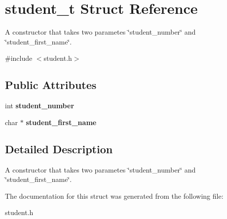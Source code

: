 \hypertarget{structstudent__t}{}\section{student\+\_\+t Struct Reference}
\label{structstudent__t}


A constructor that takes two parametes \char`\"{}student\+\_\+number\char`\"{} and \char`\"{}student\+\_\+first\+\_\+name\char`\"{}.  




{\ttfamily \#include $<$student.\+h$>$}

\subsection*{Public Attributes}
\begin{DoxyCompactItemize}
\item 
\mbox{\label{structstudent__t_a6a5ef29ff40bd423d5ad3105ff59e063}} 
int {\bfseries student\+\_\+number}
\item 
\mbox{\label{structstudent__t_a234cc57c698ffc4ced35cf7a23a17e23}} 
char $\ast$ {\bfseries student\+\_\+first\+\_\+name}
\end{DoxyCompactItemize}


\subsection{Detailed Description}
A constructor that takes two parametes \char`\"{}student\+\_\+number\char`\"{} and \char`\"{}student\+\_\+first\+\_\+name\char`\"{}. 

The documentation for this struct was generated from the following file\+:\begin{DoxyCompactItemize}
\item 
student.\+h\end{DoxyCompactItemize}
